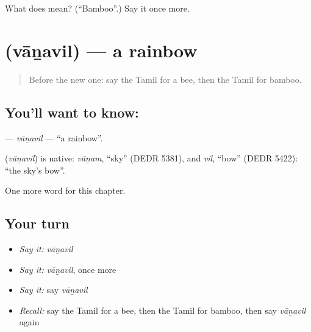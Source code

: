 \begin{tcolorbox}[breakable,colback=teal!4,colframe=teal!35!black,title={Before you move on}]
What does  mean? (\textquotedblleft{}Bamboo\textquotedblright{}.) Say it once more.
\end{tcolorbox}
\section[\texorpdfstring{\ta{வானவில்} (vāṉavil)}{வானவில் (vāṉavil)}]{ (vāṉavil) — a rainbow}

\label{lesson:TA-C219-vanavil}



\begin{quote}
Before the new one: say the Tamil for a bee, then the Tamil for bamboo.
\end{quote}

\subsection*{You'll want to know: }
\textbf{} — \emph{vāṉavil} — \textquotedblleft{}a rainbow\textquotedblright{}.

\begin{cousinweb}
\textbf{} (\emph{vāṉavil}) is native: \emph{vāṉam}, \textquotedblleft{}sky\textquotedblright{} (DEDR 5381), and \emph{vil}, \textquotedblleft{}bow\textquotedblright{} (DEDR 5422): \textquotedblleft{}the sky's bow\textquotedblright{}.
\end{cousinweb}

\begin{grammarlens}[title={What you've built}]
One more word for this chapter.
\end{grammarlens}

\subsection*{Your turn}
\begin{itemize}
\raggedright
  \item \emph{Say it:} \emph{vāṉavil}
  \item \emph{Say it:} \emph{vāṉavil}, once more
  \item \emph{Say it:} say \emph{vāṉavil}
  \item \emph{Recall:} say the Tamil for a bee, then the Tamil for bamboo, then say \emph{vāṉavil} again
\end{itemize}

